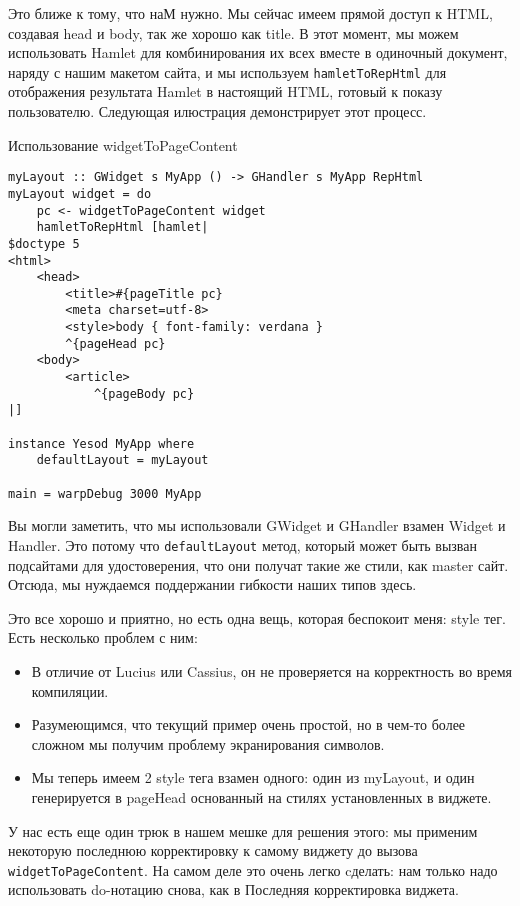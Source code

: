 Это ближе к тому, что наМ нужно. Мы сейчас имеем прямой доступ к HTML, создавая head и body, так же хорошо как title. В этот момент, мы можем использовать Hamlet для комбинирования их всех вместе в одиночный документ, наряду с нашим макетом сайта, и мы используем \lstinline'hamletToRepHtml' для отображения результата Hamlet в настоящий HTML, готовый к показу пользователю. Следующая илюстрация демонстрирует этот процесс.

Использование widgetToPageContent

\begin{lstlisting}
myLayout :: GWidget s MyApp () -> GHandler s MyApp RepHtml
myLayout widget = do
    pc <- widgetToPageContent widget
    hamletToRepHtml [hamlet|
$doctype 5
<html>
    <head>
        <title>#{pageTitle pc}
        <meta charset=utf-8>
        <style>body { font-family: verdana }
        ^{pageHead pc}
    <body>
        <article>
            ^{pageBody pc}
|]

instance Yesod MyApp where
    defaultLayout = myLayout

main = warpDebug 3000 MyApp
\end{lstlisting}

Вы могли заметить, что мы использовали GWidget и GHandler взамен Widget и Handler. Это потому что \lstinline'defaultLayout' метод, который может быть вызван подсайтами для удостоверения, что они получат такие же стили, как master сайт. Отсюда, мы нуждаемся поддержании гибкости наших типов здесь.

Это все хорошо и приятно, но есть одна вещь, которая беспокоит меня: style тег. Есть несколько проблем с ним:
\begin{itemize}
\item В отличие от Lucius или Cassius, он не проверяется на корректность во время компиляции.
\item Разумеющимся, что текущий пример очень простой, но в чем-то более сложном мы получим проблему экранирования символов.
\item Мы теперь имеем 2 style тега взамен одного: один из myLayout, и один генерируется в pageHead основанный на стилях установленных в виджете.
\end{itemize}

У нас есть еще один трюк в нашем мешке для решения этого: мы применим некоторую последнюю корректировку к самому виджету до вызова \lstinline'widgetToPageContent'. На самом деле это очень легко cделать: нам только надо использовать do-нотацию снова, как в Последняя корректировка виджета.

